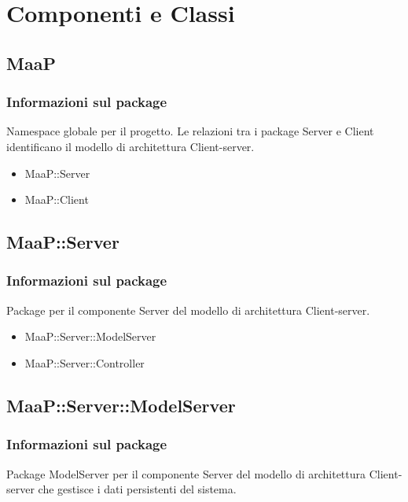\newpage
\section{Componenti e Classi}

\subsection{MaaP}
\subsubsection{Informazioni sul package}
Namespace globale per il progetto. Le relazioni tra i package Server e Client identificano il modello di architettura Client-server.
\begin{itemize}
\item MaaP::Server
\item MaaP::Client
\end{itemize}

\subsection{MaaP::Server}
\subsubsection{Informazioni sul package}
Package per il componente Server del modello di architettura Client-server.
\begin{itemize}
\item MaaP::Server::ModelServer
\item MaaP::Server::Controller
\end{itemize}

\subsection{MaaP::Server::ModelServer}
\subsubsection{Informazioni sul package}
Package ModelServer per il componente Server del modello di architettura Client-server che gestisce i dati persistenti del sistema.

